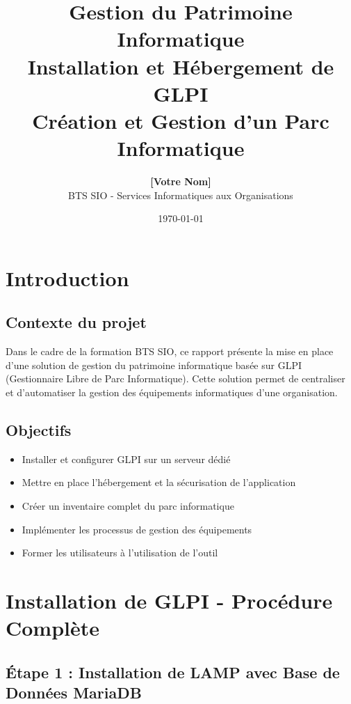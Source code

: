 \documentclass[12pt,a4paper]{article}
\title{
    \LARGE{\textbf{Gestion du Patrimoine Informatique}} \\
    \Large{Installation et Hébergement de GLPI} \\
    \Large{Création et Gestion d'un Parc Informatique}
}
\author{
    \textbf{[Votre Nom]} \\
    BTS SIO - Services Informatiques aux Organisations
}
\date{\today}
\begin{document}
\maketitle
\thispagestyle{empty}

\newpage
\tableofcontents
\newpage

\section{Introduction}

\subsection{Contexte du projet}
Dans le cadre de la formation BTS SIO, ce rapport présente la mise en place d'une solution de gestion du patrimoine informatique basée sur GLPI (Gestionnaire Libre de Parc Informatique). Cette solution permet de centraliser et d'automatiser la gestion des équipements informatiques d'une organisation.

\subsection{Objectifs}
\begin{itemize}
    \item Installer et configurer GLPI sur un serveur dédié
    \item Mettre en place l'hébergement et la sécurisation de l'application
    \item Créer un inventaire complet du parc informatique
    \item Implémenter les processus de gestion des équipements
    \item Former les utilisateurs à l'utilisation de l'outil
\end{itemize}

\section{Installation de GLPI - Procédure Complète}

\subsection{Étape 1 : Installation de LAMP avec Base de Données MariaDB}
\end{document}
